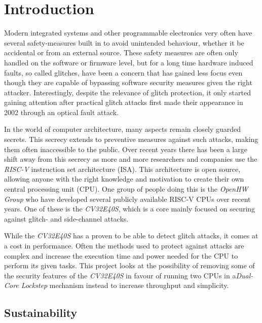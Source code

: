 \chapter{Introduction}
\label{intro} 

Modern integrated systems and other programmable electronics very often have several safety-measures built in to avoid unintended behaviour, whether it be accidental or from an external source. These safety measures are often only handled on the software or firmware level, but for a long time hardware induced faults, so called glitches, have been a concern that has gained less focus even though they are capable of bypassing software security measures given the right attacker. Interestingly, despite the relevance of glitch protection, it only started gaining attention after practical glitch attacks first made their appearance in 2002 through an optical fault attack\cite{trouchkine2019fault}. 

In the world of computer architecture, many aspects remain closely guarded secrets. This secrecy extends to preventive measures against such attacks, making them often inaccessible to the public. Over recent years there has been a large shift away from this secrecy as more and more researchers and companies use the \textit{RISC-V} instruction set architecture (ISA). This architecture is open source, allowing anyone with the right knowledge and motivation to create their own central processing unit (CPU). One group of people doing this is the \textit{OpenHW Group} who have developed several publicly available RISC-V CPUs over recent years. One of these is the \textit{CV32E40S}, which is a core mainly focused on securing against glitch- and side-channel attacks\cite{cv32e40s_manual}.

While the \textit{CV32E40S} has a proven to be able to detect glitch attacks, it comes at a cost in performance. Often the methods used to protect against attacks are complex and increase the execution time and power needed for the CPU to perform its given tasks. This project looks at the possibility of removing some of the security features of the \textit{CV32E40S} in favour of running two CPUs in a\textit{Dual-Core Lockstep} mechanism instead to increase throughput and simplicity. 

\section{Sustainability}
